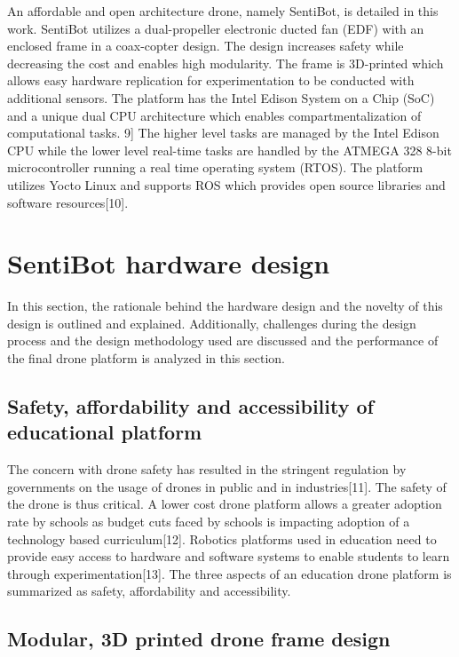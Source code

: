 \documentclass[12pt]{article}
\begin{document}
An affordable and open architecture drone, namely SentiBot, is detailed in this work. SentiBot utilizes a dual-propeller electronic ducted fan (EDF) with an enclosed frame in a coax-copter design. The design increases safety while decreasing the cost and enables high modularity. The frame is 3D-printed which allows easy hardware replication for experimentation to be conducted with additional sensors. The platform has the Intel Edison System on a Chip (SoC) and a unique dual CPU architecture which enables compartmentalization of computational tasks. 9] The higher level tasks are managed by the Intel Edison CPU while the lower level real-time tasks are handled by the ATMEGA 328 8-bit microcontroller running a real time operating system (RTOS). The platform utilizes Yocto Linux and supports ROS which provides open source libraries and software resources[10].

\section{SentiBot hardware design}

In this section, the rationale behind the hardware design and the novelty of this design is outlined and explained. Additionally, challenges during the design process and the design methodology used are discussed and the performance of the final drone platform is analyzed in this section.

\subsection{Safety, affordability and accessibility of educational platform}

The concern with drone safety has resulted in the stringent regulation by governments on the usage of drones in public and in industries[11]. The safety of the drone is thus critical. A lower cost drone platform allows a greater adoption rate by schools as budget cuts faced by schools is impacting adoption of a technology based curriculum[12]. Robotics platforms used in education need to provide easy access to hardware and software systems to enable students to learn through experimentation[13]. The three aspects of an education drone platform is summarized as safety, affordability and accessibility. 

\subsection{Modular, 3D printed drone frame design}
\end{document}
